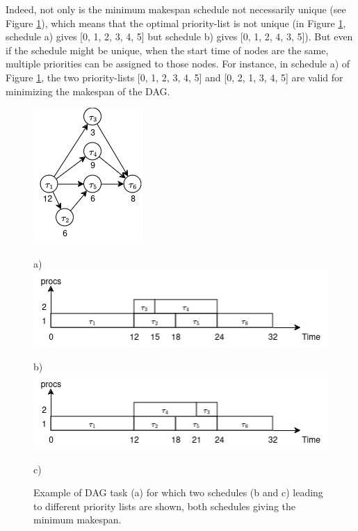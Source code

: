 Indeed, not only is the minimum makespan schedule not necessarily unique
(see Figure \ref{fig:not_unique_schedules}),
which means that the optimal priority-list is not unique
(in Figure \ref{fig:not_unique_schedules}, schedule a) gives 
[0, 1, 2, 3, 4, 5] but schedule b) gives [0, 1, 2, 4, 3, 5]).
But even if the schedule might be unique, when the start time
of nodes are the same, multiple priorities
can be assigned to those nodes.
For instance, in schedule a) of Figure \ref{fig:not_unique_schedules},
the  two priority-lists [0, 1, 2, 3, 4, 5] and [0, 2, 1, 3, 4, 5]
are valid for minimizing the makespan of the DAG.

\begin{figure}
    \centering
    \includegraphics[width=0.5\linewidth]{images/dag_same_makespan_diff_scheds.png}
    \par a)
    \includegraphics[width=\linewidth]{images/first_samemakespan_diff_sched.png}
    \par b)
    \includegraphics[width=\linewidth]{images/second_samemakespan_diff_sched.png}
    \par c)
    \caption{Example of DAG task (a) for which two schedules (b and c) leading to different
    priority lists are shown, both schedules giving the minimum makespan.}
    \label{fig:not_unique_schedules}    
\end{figure}


